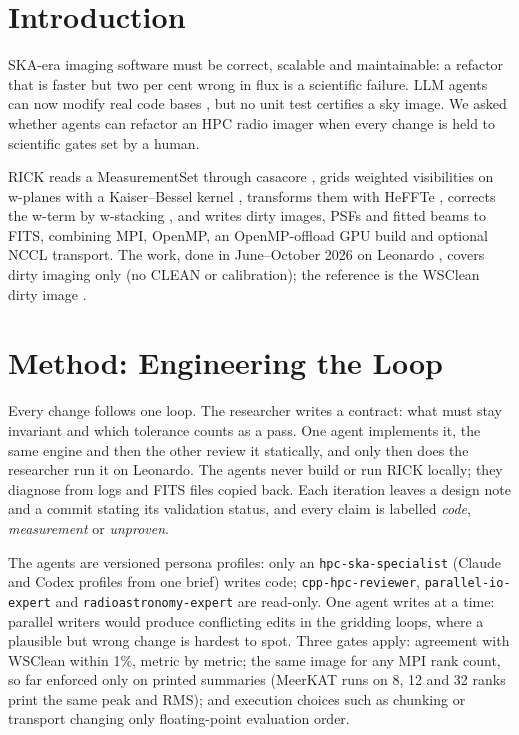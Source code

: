 \documentclass[11pt,twoside]{article}
\begin{document}

\section{Introduction}

SKA-era imaging software must be correct, scalable and maintainable: a
refactor that is faster but two per cent wrong in flux is a scientific
failure. LLM agents can now modify real code bases \citep[e.g.][]{Jimenez2024},
but no unit test certifies a sky image. We asked whether agents can refactor
an HPC radio imager when every change is held to scientific gates set by a
human.

RICK \citep{DeRubeis2025,Lacopo2025,Lacopo2026} reads a MeasurementSet through
casacore \citep{2015A&C....12..174V}, grids weighted visibilities on w-planes
with a Kaiser--Bessel kernel \citep{Jackson1991}, transforms them with HeFFTe
\citep{Ayala2020}, corrects the w-term by w-stacking
\citep{2014MNRAS.444..606O}, and writes dirty images, PSFs and fitted beams to
FITS, combining MPI, OpenMP, an OpenMP-offload GPU build and optional NCCL
transport. The work, done in June--October 2026 on Leonardo \citep{Turisini2024},
covers dirty imaging only (no CLEAN or calibration); the reference is the
WSClean dirty image \citep{2014MNRAS.444..606O}.

\section{Method: Engineering the Loop}

Every change follows one loop. The researcher writes a contract: what must
stay invariant and which tolerance counts as a pass. One agent implements it,
the same engine and then the other review it statically, and only then does
the researcher run it on Leonardo. The agents never build or run RICK locally;
they diagnose from logs and FITS files copied back. Each iteration leaves a
design note and a commit stating its validation status, and every claim is
labelled \emph{code}, \emph{measurement} or \emph{unproven}.

The agents are versioned persona profiles: only an
\texttt{hpc-ska-specialist} (Claude and Codex profiles from one brief) writes
code; \texttt{cpp-hpc-reviewer}, \texttt{parallel-io-expert} and
\texttt{radioastronomy-expert} are read-only. One agent writes at a time:
parallel writers would produce conflicting edits in the gridding loops, where
a plausible but wrong change is hardest to spot. Three gates apply: agreement
with WSClean within 1\%, metric by metric; the same image for any MPI rank
count, so far enforced only on printed summaries (MeerKAT runs on 8, 12 and 32
ranks print the same peak and RMS); and execution choices such as chunking or
transport changing only floating-point evaluation order.
\end{document}
